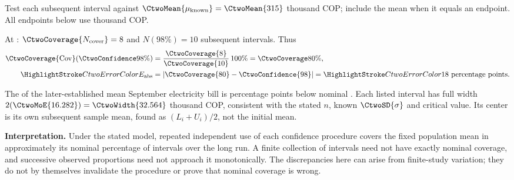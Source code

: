 Test each subsequent interval against $\CtwoMean{\mu_{\mathrm{known}}}=\CtwoMean{315}$ thousand COP; include the mean when it equals an endpoint. All endpoints below use thousand COP.



At : $\CtwoCoverage{N_{\mathrm{cover}}}=8$ and $N(98\%)=10$ subsequent intervals. Thus
\[\begin{aligned}
\CtwoCoverage{\mathrm{Cov}}(\CtwoConfidence{98\%})&=\frac{\CtwoCoverage{8}}{\CtwoCoverage{10}}\,100\%=\CtwoCoverage{80\%},\\
\CtwoError{E_{\mathrm{abs}}}&=|\CtwoCoverage{80}-\CtwoConfidence{98}|=\CtwoError{18}\text{ percentage points}.
\end{aligned}\]

The  of the later-established mean September electricity bill is  percentage points below nominal . Each listed interval has full width $2(\CtwoMoE{16.282})=\CtwoWidth{32.564}$ thousand COP, consistent with the stated $n$, known $\CtwoSD{\sigma}$ and critical value. Its center is its own subsequent sample mean, found as $(L_i+U_i)/2$, not the initial mean.

\textbf{Interpretation.} Under the stated model, repeated independent use of each confidence procedure covers the fixed population mean in approximately its nominal percentage of intervals over the long run. A finite collection of intervals need not have exactly nominal coverage, and successive observed proportions need not approach it monotonically. The discrepancies here can arise from finite-study variation; they do not by themselves invalidate the procedure or prove that nominal coverage is wrong.

